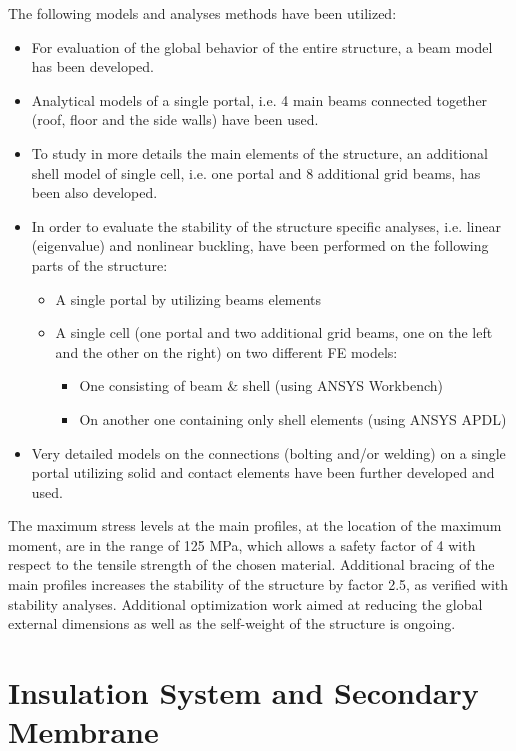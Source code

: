 The following models and analyses methods have been utilized:
\begin{itemize}
 \item{For evaluation of the global behavior of the entire structure,
       a beam model has been developed.}
 \item{Analytical models of a single portal, i.e. 4 main beams 
       connected together (roof, floor and the side walls) 
       have been used.}
 \item{To study in more details the main elements of the structure, 
       an additional shell model of single cell, i.e. one portal 
       and 8 additional grid beams, has been also developed.}
 \item{In order to evaluate the stability of the structure specific 
       analyses, i.e. linear (eigenvalue) and nonlinear buckling, 
       have been performed on the following parts of the structure:}
 \begin{itemize}
  \item{A single portal by utilizing beams elements}
  \item{A single cell (one portal and two additional grid beams, one 
        on the left and the other on the right) on two different FE models:}
  \begin{itemize}
   \item{One consisting of beam \& shell (using ANSYS Workbench)}
   \item{On another one containing only shell elements (using ANSYS APDL)} 
  \end{itemize}
 \end{itemize}
 \item{Very detailed models on the connections (bolting and/or welding) 
       on a single portal utilizing solid and contact elements have 
       been further developed and used.}
\end{itemize}

The maximum stress levels at the main profiles, at the location of 
the maximum moment, are in the range of 125 MPa, which allows a 
safety factor of 4 with respect to the tensile strength of the 
chosen material. Additional bracing of the main profiles increases 
the stability of the structure by factor 2.5, as verified with 
stability analyses.  Additional optimization work aimed at 
reducing the global external dimensions as well as the self-weight 
of the structure is ongoing. 

\section{Insulation System and Secondary Membrane}
\label{subsec:insul-2nd-mem}

